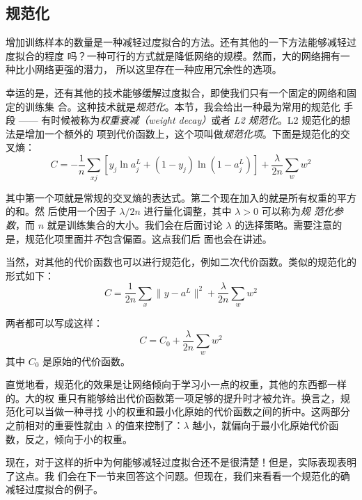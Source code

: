 \subsection{规范化}

增加训练样本的数量是一种减轻过度拟合的方法。还有其他的一下方法能够减轻过度拟合的程度
吗？一种可行的方式就是降低网络的规模。然而，大的网络拥有一种比小网络更强的潜力，
所以这里存在一种应用冗余性的选项。

幸运的是，还有其他的技术能够缓解过度拟合，即使我们只有一个固定的网络和固定的训练集
合。这种技术就是\emph{规范化}。本节，我会给出一种最为常用的规范化
手段 —— 有时候被称为\emph{权重衰减（weight decay）}或者 \emph{L2 规范化}。L2 规范化的想法是增加一个额外的
项到代价函数上，这个项叫做\emph{规范化项}。下面是规范化的交叉熵：
\begin{equation}
  C = -\frac{1}{n} \sum_{xj} \left[ y_j \ln a^L_j+(1-y_j) \ln
  (1-a^L_j)\right] + \frac{\lambda}{2n} \sum_w w^2
\label{eq:85}\tag{85}
\end{equation}

其中第一个项就是常规的交叉熵的表达式。第二个现在加入的就是所有权重的平方的和。然
后使用一个因子 $\lambda / 2n$ 进行量化调整，其中 $\lambda > 0$ 可以称为\emph{规
  范化参数}，而 $n$ 就是训练集合的大小。我们会在后面讨论
$\lambda$ 的选择策略。需要注意的是，规范化项里面并\emph{不}包含偏置。这点我们后
面也会在讲述。

当然，对其他的代价函数也可以进行规范化，例如二次代价函数。类似的规范化的形式如下：
\begin{equation}
  C = \frac{1}{2n} \sum_x \|y-a^L\|^2 + \frac{\lambda}{2n} \sum_w w^2
  \label{eq:86}\tag{86}
\end{equation}

两者都可以写成这样：
\begin{equation}
  C = C_0 + \frac{\lambda}{2n} \sum_w w^2
  \label{eq:87}\tag{87}
\end{equation}
其中 $C_0$ 是原始的代价函数。

直觉地看，规范化的效果是让网络倾向于学习小一点的权重，其他的东西都一样的。大的权
重只有能够给出代价函数第一项足够的提升时才被允许。换言之，规范化可以当做一种寻找
小的权重和最小化原始的代价函数之间的折中。这两部分之前相对的重要性就由 $\lambda$
的值来控制了：$\lambda$ 越小，就偏向于最小化原始代价函数，反之，倾向于小的权重。

现在，对于这样的折中为何能够减轻过度拟合还不是很清楚！但是，实际表现表明了这点。我
们会在下一节来回答这个问题。但现在，我们来看看一个规范化的确减轻过度拟合的例子。

